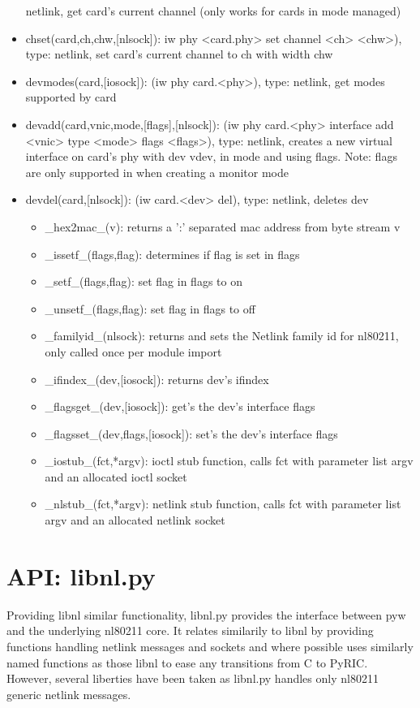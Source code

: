 \documentclass[11pt]{article}
\begin{document}
\begin{appendices}
\begin{itemize}
netlink, get card's current channel (only works for cards in mode managed)
\item chset(card,ch,chw,[nlsock]): iw phy <card.phy> set channel <ch> <chw>), 
type: netlink, set card's current channel to ch with width chw
\item devmodes(card,[iosock]): (iw phy card.<phy>), type: netlink, get modes 
supported by card
\item devadd(card,vnic,mode,[flags],[nlsock]): (iw phy card.<phy> interface add
<vnic> type <mode> flags <flags>), type: netlink, creates a new virtual interface
on card's phy with dev vdev, in mode and using flags. Note: flags are only supported
in when creating a monitor mode
\item devdel(card,[nlsock]): (iw card.<dev> del), type: netlink, deletes dev
\begin{itemize}
\item \_hex2mac\_(v): returns a ':' separated mac address from byte stream v
\item \_issetf\_(flags,flag): determines if flag is set in flags
\item \_setf\_(flags,flag): set flag in flags to on
\item \_unsetf\_(flags,flag): set flag in flags to off
\item \_familyid\_(nlsock): returns and sets the Netlink family id for nl80211, 
only called once per module import
\item \_ifindex\_(dev,[iosock]): returns dev's ifindex
\item \_flagsget\_(dev,[iosock]): get's the dev's interface flags
\item \_flagsset\_(dev,flags,[iosock]): set's the dev's interface flags
\item \_iostub\_(fct,*argv): ioctl stub function, calls fct with parameter list argv
and an allocated ioctl socket
\item \_nlstub\_(fct,*argv): netlink stub function, calls fct with parameter list
argv and an allocated netlink socket
\end{itemize}
\end{itemize}

\section{API: libnl.py}\label{sec:libnlapi}
Providing libnl similar functionality, libnl.py provides the interface between
pyw and the underlying nl80211 core. It relates similarily to libnl by providing
functions handling netlink messages and sockets and where possible uses similarly
named functions as those libnl to ease any transitions from C to PyRIC. However,
several liberties have been taken as libnl.py handles only nl80211 generic netlink
messages.


\end{appendices}
\end{document}
